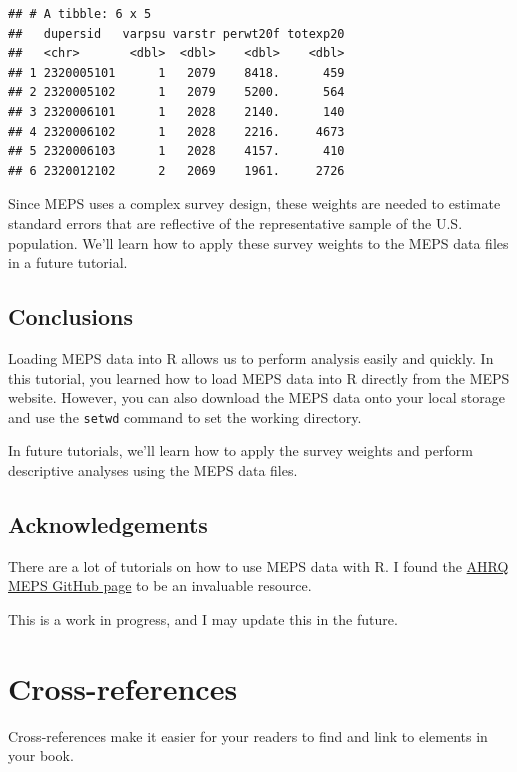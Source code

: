 \documentclass[
]{book}
\theoremstyle{definition}
\theoremstyle{definition}
\theoremstyle{definition}
\theoremstyle{definition}
\theoremstyle{remark}
\begin{document}
\begin{verbatim}
## # A tibble: 6 x 5
##   dupersid   varpsu varstr perwt20f totexp20
##   <chr>       <dbl>  <dbl>    <dbl>    <dbl>
## 1 2320005101      1   2079    8418.      459
## 2 2320005102      1   2079    5200.      564
## 3 2320006101      1   2028    2140.      140
## 4 2320006102      1   2028    2216.     4673
## 5 2320006103      1   2028    4157.      410
## 6 2320012102      2   2069    1961.     2726
\end{verbatim}

Since MEPS uses a complex survey design, these weights are needed to estimate standard errors that are reflective of the representative sample of the U.S. population. We'll learn how to apply these survey weights to the MEPS data files in a future tutorial.

\hypertarget{conclusions}{%
\section{Conclusions}\label{conclusions}}

Loading MEPS data into R allows us to perform analysis easily and quickly. In this tutorial, you learned how to load MEPS data into R directly from the MEPS website. However, you can also download the MEPS data onto your local storage and use the \texttt{setwd} command to set the working directory.

In future tutorials, we'll learn how to apply the survey weights and perform descriptive analyses using the MEPS data files.

\hypertarget{acknowledgements}{%
\section{Acknowledgements}\label{acknowledgements}}

There are a lot of tutorials on how to use MEPS data with R. I found the \href{https://github.com/HHS-AHRQ/MEPS}{AHRQ MEPS GitHub page} to be an invaluable resource.

This is a work in progress, and I may update this in the future.

\hypertarget{cross}{%
\chapter{Cross-references}\label{cross}}

Cross-references make it easier for your readers to find and link to elements in your book.
\end{document}
